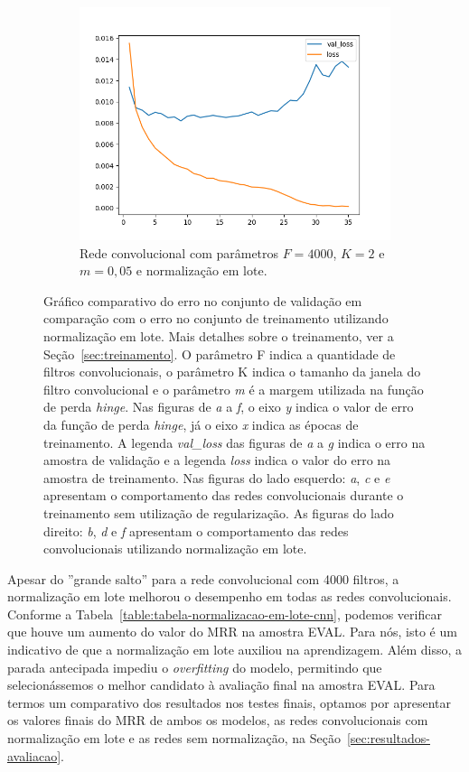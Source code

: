 \begin{figure}[H]
\begin{subfigure}{.5\textwidth}
  \includegraphics[width=.8\linewidth]{figuras/ape-ajustes-hiper-parametros/cnn-with-bn-4000-k-2-m-005.png}
  \caption{Rede convolucional com parâmetros $F = 4000$, $K = 2$ e $m = 0,05$ e normalização em lote.}
  \label{fig:cnn-4000-k-2-m-005-normalizacao-em-lote}
\end{subfigure}

\caption[Gráfico comparativo do erro no conjunto de validação em comparação com o erro no conjunto de treinamento utilizando normalização em lote.]{Gráfico comparativo do erro no conjunto de validação em comparação com o erro no conjunto de treinamento utilizando normalização em lote. Mais detalhes sobre o treinamento, ver a Seção~\ref{sec:treinamento}. O parâmetro F indica a quantidade de filtros convolucionais, o parâmetro K indica o tamanho da janela do filtro convolucional e o parâmetro \emph{m} é a margem utilizada na função de perda \textit{hinge}. Nas figuras de \emph{a} a \emph{f}, o eixo \emph{y} indica o valor de erro da função de perda \textit{hinge}, já o eixo \emph{x} indica as épocas de treinamento. A legenda \emph{val\_loss} das figuras de \emph{a} a \emph{g} indica o erro na amostra de validação e a legenda \emph{loss} indica o valor do erro na amostra de treinamento. Nas figuras do lado esquerdo: \emph{a}, \emph{c} e \emph{e} apresentam o comportamento das redes convolucionais durante o treinamento sem utilização de regularização. As figuras do lado direito: \emph{b}, \emph{d} e \emph{f} apresentam o comportamento das redes convolucionais utilizando normalização em lote. }
\label{fig:treinamento-cnn-normalizacao-em-lote}
\end{figure}

Apesar do ''grande salto'' para a rede convolucional com 4000 filtros, a normalização em lote melhorou o desempenho em todas as redes convolucionais. Conforme a Tabela~\ref{table:tabela-normalizacao-em-lote-cnn}, podemos verificar que houve um aumento do valor do MRR na amostra EVAL. Para nós, isto é um indicativo de que a normalização em lote auxiliou na aprendizagem. Além disso, a parada antecipada impediu o \textit{overfitting} do modelo, permitindo que selecionássemos o melhor candidato à avaliação final na amostra EVAL. Para termos um comparativo dos resultados nos testes finais, optamos por apresentar os valores finais do MRR de ambos os modelos, as redes convolucionais com normalização em lote e as redes sem normalização, na Seção~\ref{sec:resultados-avaliacao}.

